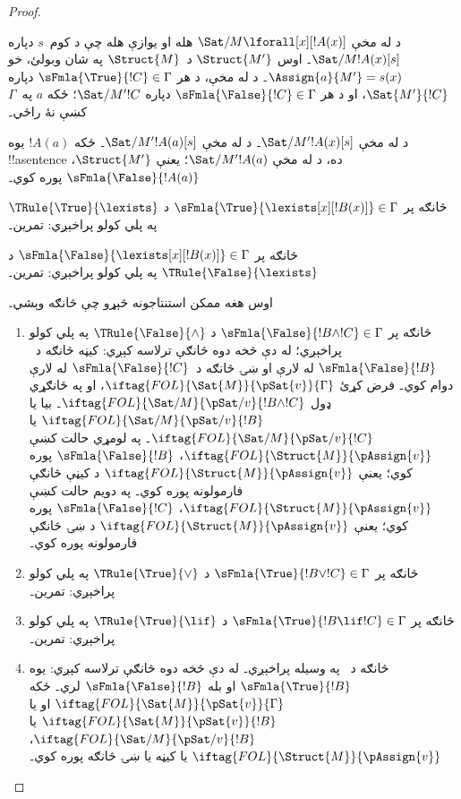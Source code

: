 \documentclass[../../../include/open-logic-section]{subfiles}
\begin{document}
\begin{proof}
\begin{enumerate}
{  د  له مخې
  $\Sat/{M}{\lforall[x][!A(x)]}$ هله او يوازې هله چې د کوم~$s$
  دپاره $\Sat/{M}{!A(x)}[s]$۔ اوس $\Struct{M'}$ د~$\Struct{M}$ په
  شان وبولئ، خو $\Assign{a}{M'} = s(x)$۔ د
   له مخې، د هر
  $\sFmla{\True}{!C} \in \Gamma$ دپاره $\Sat{M'}{!C}$، او د هر
  $\sFmla{\False}{!C} \in \Gamma$ دپاره $\Sat/{M'}{!C}$؛ ځکه
  $a$ په~$\Gamma$ کښې نۀ راځي۔

  د  له مخې
  $\Sat/{M'}{!A(x)}[s]$۔ د  له مخې
  $\Sat/{M'}{!A(a)}[s]$۔ ځکه $!A(a)$ يوه !!a{sentence} ده، د
   له مخې
  $\Sat/{M'}{!A(a)}$؛ يعنې $\Struct{M'}$،
  $\sFmla{\False}{!A(a)}$ پوره کوي۔
\item څانګه پر $\sFmla{\True}{\lexists[x][!B(x)]} \in \Gamma$ د
  $\TRule{\True}{\lexists}$ په پلي کولو پراخېږي: تمرين۔
\item څانګه پر $\sFmla{\False}{\lexists[x][!B(x)]} \in \Gamma$ د
  $\TRule{\False}{\lexists}$ په پلي کولو پراخېږي: تمرين۔}{}
\end{enumerate}
اوس هغه ممکن استنتاجونه څېړو چې څانګه وېشي۔
\begin{enumerate}
\item څانګه پر $\sFmla{\False}{!B \land !C} \in \Gamma$ د
  $\TRule{\False}{\land}$ په پلي کولو پراخېږي؛ له دې څخه دوه څانګې
  ترلاسه کېږي: کيڼه څانګه د~$\sFmla{\False}{!B}$ له لارې او ښۍ
  څانګه د~$\sFmla{\False}{!C}$ له لارې دوام کوي۔ فرض کړئ
  $\iftag{FOL}{\Sat{M}}{\pSat{v}}{\Gamma}$، او په ځانګړي ډول
  $\iftag{FOL}{\Sat/{M}}{\pSat/{v}}{!B \land !C}$۔ بيا يا
  $\iftag{FOL}{\Sat/{M}}{\pSat/{v}}{!B}$ يا
  $\iftag{FOL}{\Sat/{M}}{\pSat/{v}}{!C}$۔ په لومړي حالت کښې
  $\iftag{FOL}{\Struct{M}}{\pAssign{v}}$،
  $\sFmla{\False}{!B}$ پوره کوي؛ يعنې
  $\iftag{FOL}{\Struct{M}}{\pAssign{v}}$ د کيڼې څانګې فارمولونه
  پوره کوي۔ په دويم حالت کښې
  $\iftag{FOL}{\Struct{M}}{\pAssign{v}}$،
  $\sFmla{\False}{!C}$ پوره کوي؛ يعنې
  $\iftag{FOL}{\Struct{M}}{\pAssign{v}}$ د ښۍ څانګې فارمولونه
  پوره کوي۔
\item څانګه پر $\sFmla{\True}{!B \lor !C} \in \Gamma$ د
  $\TRule{\True}{\lor}$ په پلي کولو پراخېږي: تمرين۔
\item څانګه پر $\sFmla{\True}{!B \lif !C} \in \Gamma$ د
  $\TRule{\True}{\lif}$ په پلي کولو پراخېږي: تمرين۔
\item څانګه د~\Cut{} په وسيله پراخېږي۔ له دې څخه دوه څانګې ترلاسه
  کېږي: يوه $\sFmla{\True}{!B}$ او بله $\sFmla{\False}{!B}$ لري۔
  ځکه $\iftag{FOL}{\Sat{M}}{\pSat{v}}{\Gamma}$ او يا
  $\iftag{FOL}{\Sat{M}}{\pSat{v}}{!B}$ يا
  $\iftag{FOL}{\Sat/{M}}{\pSat/{v}}{!B}$،
  $\iftag{FOL}{\Struct{M}}{\pAssign{v}}$ يا کيڼه يا ښۍ څانګه پوره
  کوي۔
\end{enumerate}
\end{proof}
\end{document}
